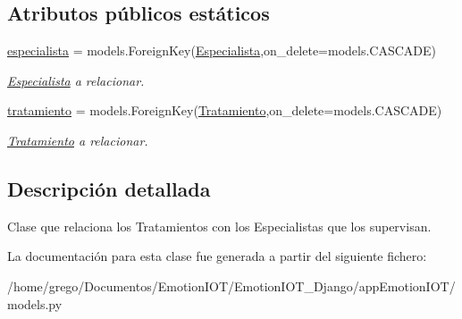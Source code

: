 \subsection*{Atributos públicos estáticos}
\begin{DoxyCompactItemize}
\item 
\hyperlink{classappEmotionIOT_1_1models_1_1Supervisa_aab237a17b9b43b6227b3e9e09fbd3089}{especialista} = models.\+Foreign\+Key(\hyperlink{classappEmotionIOT_1_1models_1_1Especialista}{Especialista},on\+\_\+delete=models.\+C\+A\+S\+C\+A\+DE)\hypertarget{classappEmotionIOT_1_1models_1_1Supervisa_aab237a17b9b43b6227b3e9e09fbd3089}{}\label{classappEmotionIOT_1_1models_1_1Supervisa_aab237a17b9b43b6227b3e9e09fbd3089}

\begin{DoxyCompactList}\small\item\em \hyperlink{classappEmotionIOT_1_1models_1_1Especialista}{Especialista} a relacionar. \end{DoxyCompactList}\item 
\hyperlink{classappEmotionIOT_1_1models_1_1Supervisa_a923533a716f64694fee465a356069adb}{tratamiento} = models.\+Foreign\+Key(\hyperlink{classappEmotionIOT_1_1models_1_1Tratamiento}{Tratamiento},on\+\_\+delete=models.\+C\+A\+S\+C\+A\+DE)\hypertarget{classappEmotionIOT_1_1models_1_1Supervisa_a923533a716f64694fee465a356069adb}{}\label{classappEmotionIOT_1_1models_1_1Supervisa_a923533a716f64694fee465a356069adb}

\begin{DoxyCompactList}\small\item\em \hyperlink{classappEmotionIOT_1_1models_1_1Tratamiento}{Tratamiento} a relacionar. \end{DoxyCompactList}\end{DoxyCompactItemize}


\subsection{Descripción detallada}
Clase que relaciona los Tratamientos con los Especialistas que los supervisan. 

La documentación para esta clase fue generada a partir del siguiente fichero\+:\begin{DoxyCompactItemize}
\item 
/home/grego/\+Documentos/\+Emotion\+I\+O\+T/\+Emotion\+I\+O\+T\+\_\+\+Django/app\+Emotion\+I\+O\+T/models.\+py\end{DoxyCompactItemize}
